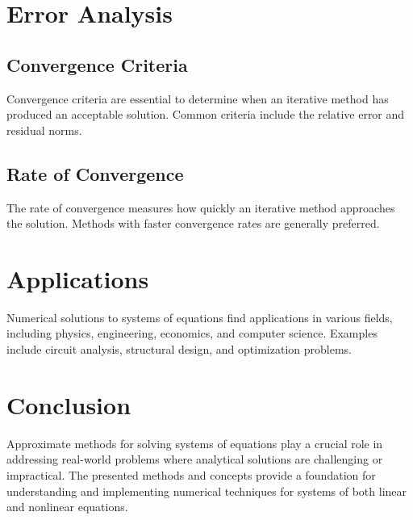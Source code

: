 \documentclass{article}
\begin{document}
\section{Error Analysis}

\subsection{Convergence Criteria}

Convergence criteria are essential to determine when an iterative method has produced an acceptable solution. Common criteria include the relative error and residual norms.

\subsection{Rate of Convergence}

The rate of convergence measures how quickly an iterative method approaches the solution. Methods with faster convergence rates are generally preferred.

\section{Applications}

Numerical solutions to systems of equations find applications in various fields, including physics, engineering, economics, and computer science. Examples include circuit analysis, structural design, and optimization problems.

\section{Conclusion}

Approximate methods for solving systems of equations play a crucial role in addressing real-world problems where analytical solutions are challenging or impractical. The presented methods and concepts provide a foundation for understanding and implementing numerical techniques for systems of both linear and nonlinear equations.
\end{document}
